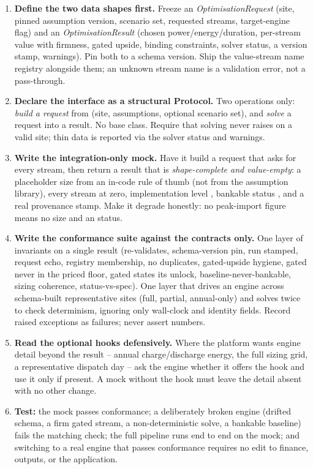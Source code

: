 \begin{rebuild}
\begin{enumerate}
  \item \textbf{Define the two data shapes first.} Freeze an \emph{OptimisationRequest} (site, pinned assumption version, scenario set, requested streams, target-engine flag) and an \emph{OptimisationResult} (chosen power/energy/duration, per-stream value with firmness, gated upside, binding constraints, solver status, a version stamp, warnings). Pin both to a schema version. Ship the value-stream name registry alongside them; an unknown stream name is a validation error, not a pass-through.
  \item \textbf{Declare the interface as a structural Protocol.} Two operations only: \emph{build a request} from (site, assumptions, optional scenario set), and \emph{solve} a request into a result. No base class. Require that solving never raises on a valid site; thin data is reported via the solver status and warnings.
  \item \textbf{Write the integration-only mock.} Have it build a request that asks for every stream, then return a result that is \emph{shape-complete and value-empty}: a placeholder size from an in-code rule of thumb (not from the assumption library), every stream at zero, implementation level , bankable status , and a real provenance stamp. Make it degrade honestly: no peak-import figure means no size and an  status.
  \item \textbf{Write the conformance suite against the contracts only.} One layer of invariants on a single result (re-validates, schema-version pin, run stamped, request echo, registry membership, no duplicates, gated-upside hygiene, gated never in the priced floor, gated states its unlock, baseline-never-bankable, sizing coherence, status-vs-spec). One layer that drives an engine across schema-built representative sites (full, partial, annual-only) and solves twice to check determinism, ignoring only wall-clock and identity fields. Record raised exceptions as failures; never assert numbers.
  \item \textbf{Read the optional hooks defensively.} Where the platform wants engine detail beyond the result -- annual charge/discharge energy, the full sizing grid, a representative dispatch day -- ask the engine whether it offers the hook and use it only if present. A mock without the hook must leave the detail absent with no other change.
  \item \textbf{Test:} the mock passes conformance; a deliberately broken engine (drifted schema, a firm gated stream, a non-deterministic solve, a bankable baseline) fails the matching check; the full pipeline runs end to end on the mock; and switching to a real engine that passes conformance requires no edit to finance, outputs, or the application.
\end{enumerate}
\end{rebuild}


